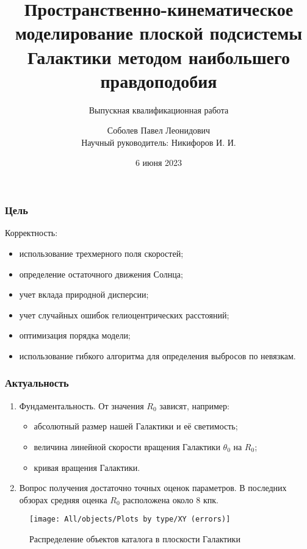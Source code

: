 \documentclass{beamer}
\title{Пространственно-кинематическое моделирование плоской подсистемы Галактики методом наибольшего правдоподобия}
\subtitle{Выпускная квалификационная работа}
\author{Соболев Павел Леонидович\\Научный руководитель: Никифоров И. И.}
\date{6 июня 2023}
\begin{document}
\begin{frame}
\titlepage
\end{frame}

\begin{frame}
\frametitle{Цель}
Корректность:
\begin{itemize}
  \item использование трехмерного поля скоростей;
  \item определение остаточного движения Солнца;
  \item учет вклада природной дисперсии;
  \item учет случайных ошибок гелиоцентрических расстояний;
  \item оптимизация порядка модели;
  \item использование гибкого алгоритма для определения выбросов по невязкам.
\end{itemize}
\end{frame}

\begin{frame}
\frametitle{Актуальность}
\begin{enumerate}
  \item Фундаментальность. От значения $ R_0 $ зависят, например:
  \begin{itemize}
    \item абсолютный размер нашей Галактики и её светимость;
    \item величина линейной скорости вращения Галактики $ \theta_0 $ на $ R_0 $;
    \item кривая вращения Галактики.
  \end{itemize}
  \item Вопрос получения достаточно точных оценок параметров. В последних обзорах средняя оценка $ R_0 $ расположена около 8 кпк.
\end{enumerate}
\end{frame}

\begin{frame}
\begin{figure}
  \centering
  \texttt{[image: All/objects/Plots by type/XY (errors)]}
  \caption{Распределение объектов каталога в плоскости Галактики}
\end{figure}
\end{frame}
\end{document}
